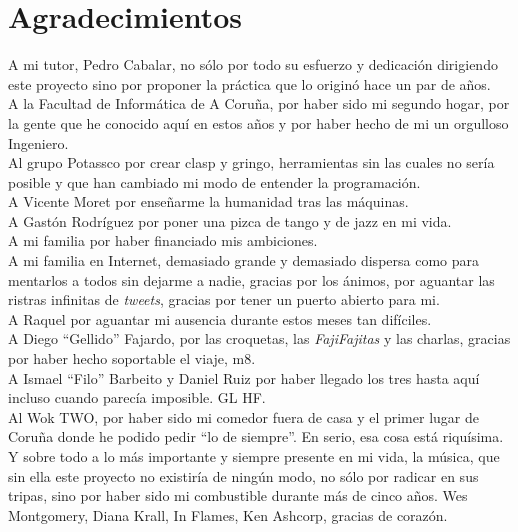 \thispagestyle{empty}
\section*{Agradecimientos}
A mi tutor, Pedro Cabalar, no sólo por todo su esfuerzo y dedicación dirigiendo este proyecto sino por proponer la práctica que lo originó hace un par de años. \\
A la Facultad de Informática de A Coruña, por haber sido mi segundo hogar, por la gente que he conocido aquí en estos años y por haber hecho de mi un orgulloso Ingeniero. \\
Al grupo Potassco por crear clasp y gringo, herramientas sin las cuales no sería posible y que han cambiado mi modo de entender la programación. \\
A Vicente Moret por enseñarme la humanidad tras las máquinas. \\
A Gastón Rodríguez por poner una pizca de tango y de jazz en mi vida. \\
A mi familia por haber financiado mis ambiciones. \\
A mi familia en Internet, demasiado grande y demasiado dispersa como para mentarlos a todos sin dejarme a nadie, gracias por los ánimos, por aguantar las ristras infinitas de \textit{tweets}, gracias por tener un puerto abierto para mi. \\
A Raquel por aguantar mi ausencia durante estos meses tan difíciles. \\
A Diego ``Gellido'' Fajardo, por las croquetas, las \textit{FajiFajitas} y las charlas, gracias por haber hecho soportable el viaje, m8. \\
A Ismael ``Filo'' Barbeito y Daniel Ruiz por haber llegado los tres hasta aquí incluso cuando parecía imposible. GL HF. \\
Al Wok TWO, por haber sido mi comedor fuera de casa y el primer lugar de Coruña donde he podido pedir ``lo de siempre''. En serio, esa cosa está riquísima. \\
Y sobre todo a lo más importante y siempre presente en mi vida, la música, que sin ella este proyecto no existiría de ningún modo, no sólo por radicar en sus tripas, sino por haber sido mi combustible durante más de cinco años. Wes Montgomery, Diana Krall, In Flames, Ken Ashcorp, gracias de corazón. \\
